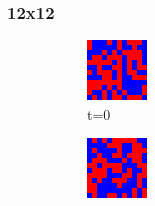\documentclass[a4paper, 11pt]{article}
\begin{document}
\subsubsection{12x12}
\begin{figure}[H]
\centering
\begin{subfigure}{.25\textwidth}
  \centering
  \includegraphics[width=0.9\linewidth]{SNOWDRIFT_MOORE_12x12_t00}
  \caption{t=0}
\end{subfigure}%
\begin{subfigure}{.25\textwidth}
  \centering
  \includegraphics[width=0.9\linewidth]{SNOWDRIFT_MOORE_12x12_t01}

\end{subfigure}
\end{figure}
\end{document}
